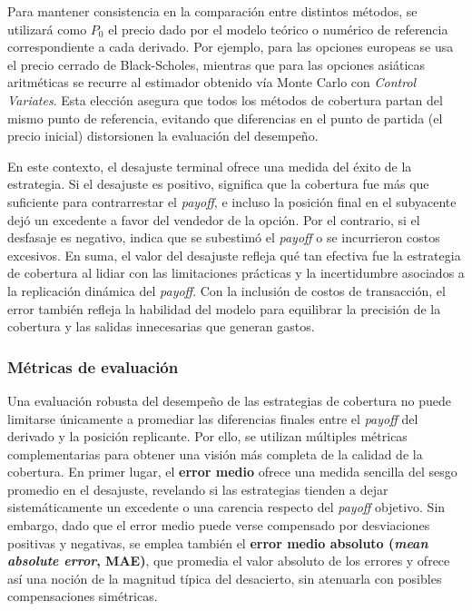 \documentclass[11pt,a4paper,spanish]{article}
\numberwithin{equation}{section} %
\begin{document}
Para mantener consistencia en la comparación entre distintos métodos, se utilizará como \(P_0\) el precio dado por el modelo teórico o numérico de referencia correspondiente a cada derivado. Por ejemplo, para las opciones europeas se usa el precio cerrado de Black-Scholes, mientras que para las opciones asiáticas aritméticas se recurre al estimador obtenido vía Monte Carlo con \textit{Control Variates}. Esta elección asegura que todos los métodos de cobertura partan del mismo punto de referencia, evitando que diferencias en el punto de partida (el precio inicial) distorsionen la evaluación del desempeño.

En este contexto, el desajuste terminal ofrece una medida del éxito de la estrategia. Si el desajuste es positivo, significa que la cobertura fue más que suficiente para contrarrestar el \textit{payoff}, e incluso la posición final en el subyacente dejó un excedente a favor del vendedor de la opción. Por el contrario, si el desfasaje es negativo, indica que se subestimó el \textit{payoff} o se incurrieron costos excesivos. En suma, el valor del desajuste refleja qué tan efectiva fue la estrategia de cobertura al lidiar con las limitaciones prácticas y la incertidumbre asociados a la replicación dinámica del \textit{payoff}. Con la inclusión de costos de transacción, el error también refleja la habilidad del modelo para equilibrar la precisión de la cobertura y las salidas innecesarias que generan gastos.





\subsubsection{Métricas de evaluación}

Una evaluación robusta del desempeño de las estrategias de cobertura no puede limitarse únicamente a promediar las diferencias finales entre el \textit{payoff} del derivado y la posición replicante. Por ello, se utilizan múltiples métricas complementarias para obtener una visión más completa de la calidad de la cobertura. En primer lugar, el \textbf{error medio} ofrece una medida sencilla del sesgo promedio en el desajuste, revelando si las estrategias tienden a dejar sistemáticamente un excedente o una carencia respecto del \textit{payoff} objetivo. Sin embargo, dado que el error medio puede verse compensado por desviaciones positivas y negativas, se emplea también el \textbf{error medio absoluto (\textit{mean absolute error}, MAE)}, que promedia el valor absoluto de los errores y ofrece así una noción de la magnitud típica del desacierto, sin atenuarla con posibles compensaciones simétricas.
\end{document}
